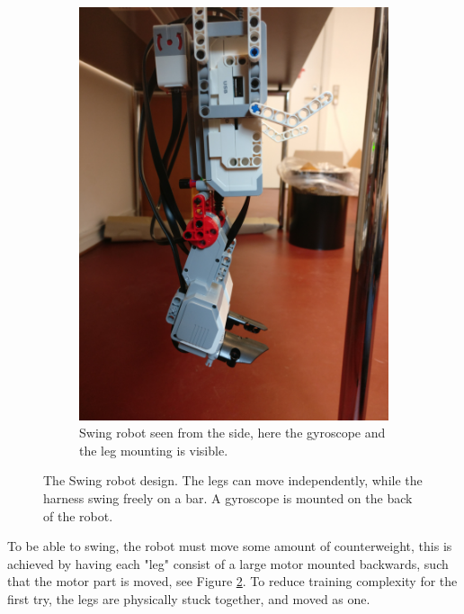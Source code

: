 \documentclass[11pt, a4paper]{article}
\begin{document}
\begin{figure}[H]
\begin{subfigure}{.48\textwidth}
		\label{fig:swing_robot_front}
	\end{subfigure}
	\begin{subfigure}{.48\textwidth}
		\centering
		\includegraphics[width=1\linewidth]{images/swing_robot_side_right}
		\caption{Swing robot seen from the side, here the gyroscope and the leg mounting is visible.}
		\label{fig:swing_robot_side}
	\end{subfigure}%
	\caption{The Swing robot design. The legs can move independently, while the harness swing freely on a bar. A gyroscope is mounted on the back of the robot.}
	\label{fig:swing_robot}
\end{figure}

To be able to swing, the robot must move some amount of counterweight, this is achieved by having each "leg" consist of a large motor mounted backwards, such that the motor part is moved, see Figure \ref{fig:swing_robot_side}. To reduce training complexity for the first try, the legs are physically stuck together, and moved as one.
\end{document}
